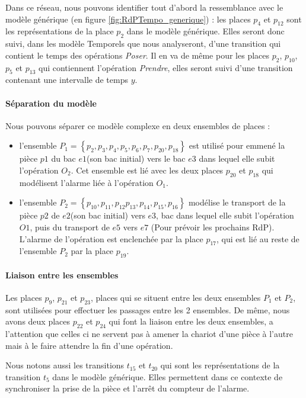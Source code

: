 Dans ce réseau, nous pouvons identifier tout d'abord la ressemblance avec le modèle générique (en figure \ref{fig:RdPTempo_generique}) : les places $p_4$ et $p_{12}$ sont les représentations de la place $p_2$ dans le modèle générique. Elles seront donc suivi, dans les modèle Temporels que nous analyseront, d'une transition qui contient le temps des opérations \emph{Poser}. Il en va de même pour les places $p_2$, $p_{10}$, $p_{5}$ et $p_{13}$ qui contiennent l'opération \emph{Prendre}, elles seront suivi d'une transition contenant une intervalle de temps $y$.

\paragraph*{Séparation du modèle}
Nous pouvons séparer ce modèle complexe en deux ensembles de places : \begin{itemize}
\item l'ensemble $P_1 =\left\lbrace p_2,p_3,p_4,p_5,p_6,p_7,p_{20},p_{18}\right\rbrace$ est utilisé pour emmené la pièce $p1$ du bac $e1$(son bac initial) vers le bac $e3$ dans lequel elle subit l'opération $O_2$. Cet ensemble est lié avec les deux places $p_{20}$ et $p_{18}$ qui modélisent l'alarme liée à l'opération $O_1$.
\item  l'ensemble $P_2 =\left\lbrace p_{10}, p_{11}, p_{12} p_{13}, p_{14}, p_{15}, p_{16}\right\rbrace$ modélise le transport de la pièce $p2$ de $e2$(son bac initial) vers $e3$, bac dans lequel elle subit l'opération $O1$, puis du transport de $e5$ vers $e7$ (Pour prévoir les prochains RdP). L'alarme de l'opération est enclenchée par la place $p_{17}$, qui est lié au reste de l'ensemble $P_2$ par la place $p_{19}$.
\end{itemize}
	
\paragraph*{Liaison entre les ensembles}
Les places $p_9$, $p_{21}$ et $p_{23}$, places qui se situent entre les deux ensembles $P_1$ et $P_2$, sont utilisées pour effectuer les passages entre les 2 ensembles. De même, nous avons deux places $p_{22}$ et $p_{24}$ qui font la liaison entre les deux ensembles, a l'attention que celles ci ne servent pas à amener la chariot d'une pièce à l'autre mais à le faire attendre la fin d'une opération.


Nous notons aussi les transitions $t_{15}$ et $t_{20}$ qui sont les représentations de la transition $t_5$ dans le modèle générique. Elles permettent dans ce contexte de synchroniser la prise de la pièce et l'arrêt du compteur de l'alarme. 

